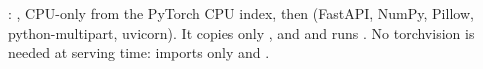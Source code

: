 \begin{repo}[container]
: , CPU-only  from the PyTorch CPU index, then  (FastAPI, NumPy, Pillow, python-multipart, uvicorn). It copies only ,  and  and runs . No torchvision is needed at serving time:  imports only  and .
\end{repo}

